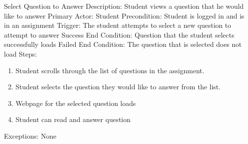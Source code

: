    
    \begin{section}{Select Question to Answer}
        Description: Student views a question that he would like to answer \newline
        Primary Actor: Student \newline
        Precondition: Student is logged in and is in an assignment         \newline
        Trigger: The student attempts to select a new question      to attempt to answer \newline
        Success End Condition: Question that the student selects     successfully loads \newline
        Failed End Condition: The question that is selected does     not load \newline
        \newline
        Steps:
        \begin{enumerate}
            \item{Student scrolls through the list of questions in the assignment.}
            \item{Student selects the question they would like to        answer from the list.}
            \item{Webpage for the selected question loads}
            \item{Student can read and answer question}
        \end{enumerate}
        Exceptions: None
    \end{section}
        
